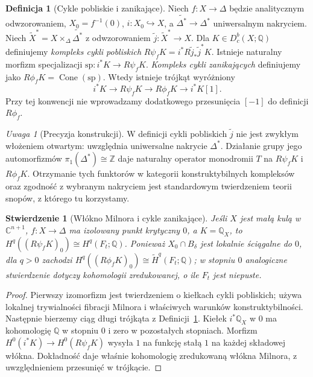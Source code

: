 \documentclass[11pt,a4paper,oneside]{report}
\newcommand{\C}{\mathbb{C}}
\newcommand{\Z}{\mathbb{Z}}
\newcommand{\Q}{\mathbb{Q}}
\theoremstyle{plain}
\newtheorem{stwierdzenie}[twierdzenie]{Stwierdzenie}
\theoremstyle{definition}
\newtheorem{definicja}[twierdzenie]{Definicja}
\theoremstyle{remark}
\newtheorem{uwaga}[twierdzenie]{Uwaga}
\begin{document}
\begin{definicja}[Cykle pobliskie i zanikające]
\label{def:nearby-vanishing-xiv}
Niech $f:X\to\Delta$ będzie analitycznym odwzorowaniem,
$X_0=f^{-1}(0)$, $i:X_0\hookrightarrow X$, a
$\widetilde{\Delta^*}\to\Delta^*$ uniwersalnym nakryciem.
Niech $\widetilde X^*=X\times_\Delta\widetilde{\Delta^*}$
z odwzorowaniem $\widetilde j:\widetilde X^*\to X$.
Dla $K\in D_c^b(X;\Q)$ definiujemy
\emph{kompleks cykli pobliskich}
$R\psi_f K=i^*R\widetilde j_*\widetilde j^*K$.
Istnieje naturalny morfizm specjalizacji
$\mathrm{sp}:i^*K\to R\psi_fK$.
\emph{Kompleks cykli zanikających} definiujemy jako
$R\phi_fK=\operatorname{Cone}(\mathrm{sp})$.
Wtedy istnieje trójkąt wyróżniony
\[
i^*K\longrightarrow R\psi_fK
\longrightarrow R\phi_fK\longrightarrow i^*K[1].
\]
Przy tej konwencji nie wprowadzamy dodatkowego
przesunięcia $[-1]$ do definicji $R\phi_f$.
\end{definicja}
\begin{uwaga}[Precyzja konstrukcji]
W definicji cykli pobliskich $\widetilde j$
nie jest zwykłym włożeniem otwartym:
uwzględnia uniwersalne nakrycie $\Delta^*$.
Działanie grupy jego automorfizmów
$\pi_1(\Delta^*)\cong\Z$ daje naturalny
operator monodromii $T$ na $R\psi_fK$ i $R\phi_fK$.
Otrzymanie tych funktorów w kategorii
konstruktybilnych kompleksów oraz zgodność
z wybranym nakryciem jest standardowym twierdzeniem
teorii snopów, z którego tu korzystamy.
\end{uwaga}

\begin{stwierdzenie}[Włókno Milnora i cykle zanikające]
\label{prop:milnor-stalk-xiv}
Jeśli $X$ jest małą kulą w $\C^{n+1}$,
$f:X\to\Delta$ ma izolowany punkt krytyczny $0$,
a $K=\Q_X$, to
$H^q((R\psi_fK)_0)\cong H^q(F_t;\Q)$.
Ponieważ $X_0\cap B_\delta$ jest lokalnie
ściągalne do $0$, dla $q>0$ zachodzi
$H^q((R\phi_fK)_0)\cong\widetilde H^q(F_t;\Q)$;
w stopniu $0$ analogiczne stwierdzenie dotyczy
kohomologii zredukowanej, o ile $F_t$ jest niepuste.
\end{stwierdzenie}
\begin{proof}
Pierwszy izomorfizm jest twierdzeniem o kiełkach
cykli pobliskich; używa lokalnej trywialności
fibracji Milnora i właściwych warunków
konstruktybilności. Następnie bierzemy
ciąg długi trójkąta z
Definicji~\ref{def:nearby-vanishing-xiv}.
Kiełek $i^*\Q_X$ w $0$ ma kohomologię $\Q$
w stopniu $0$ i zero w pozostałych stopniach.
Morfizm $H^0(i^*K)\to H^0(R\psi_fK)$
wysyła $1$ na funkcję stałą $1$ na każdej
składowej włókna. Dokładność daje właśnie
kohomologię zredukowaną włókna Milnora,
z uwzględnieniem przesunięć w trójkącie.
\end{proof}
\end{document}
